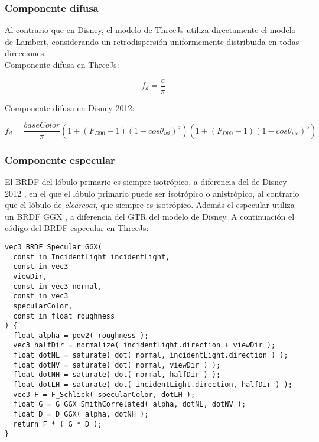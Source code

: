   \subsubsection{Componente difusa}
  Al contrario que en Disney, el modelo de ThreeJs utiliza directamente el modelo de Lambert, considerando un retrodispersi\'on
  uniformemente distribuida en todas direcciones.\\

  Componente difusa en ThreeJs:

  \begin{equation}
    f_d = \frac{c}{\pi}
  \end{equation}
  \singlespacing

  Componente difusa en Disney 2012:

  \begin{equation}
    f_d = \frac{baseColor}{\pi}
    \left(  1 + (F_{D90} - 1)(1 - cos\theta_{wi})^5  \right)
    \left(  1 + (F_{D90} - 1)(1 - cos\theta_{wo})^5  \right)
  \end{equation}
  \singlespacing


  \subsubsection{Componente especular}
  El BRDF del l\'obulo primario es siempre isotr\'opico, a diferencia del de Disney 2012 \autocite{disney12}, en el que
  el l\'obulo primario puede ser isotr\'opico o anistr\'opico, al contrario que el l\'obulo de \textit{clearcoat},
  que siempre es isotr\'opico. Adem\'as el especular utiliza un BRDF GGX \autocite{ggx}, a diferencia del GTR \autocite{disney12} del modelo de Disney.
  A continuaci\'on el c\'odigo del BRDF especular en ThreeJs:

  \singlespacing
  \begin{lstlisting}[caption=Clase MeshClothMaterial]
vec3 BRDF_Specular_GGX(
  const in IncidentLight incidentLight,
  const in vec3
  viewDir,
  const in vec3 normal,
  const in vec3
  specularColor,
  const in float roughness
) {
  float alpha = pow2( roughness );
  vec3 halfDir = normalize( incidentLight.direction + viewDir );
  float dotNL = saturate( dot( normal, incidentLight.direction ) );
  float dotNV = saturate( dot( normal, viewDir ) );
  float dotNH = saturate( dot( normal, halfDir ) );
  float dotLH = saturate( dot( incidentLight.direction, halfDir ) );
  vec3 F = F_Schlick( specularColor, dotLH );
  float G = G_GGX_SmithCorrelated( alpha, dotNL, dotNV );
  float D = D_GGX( alpha, dotNH );
  return F * ( G * D );
}
  \end{lstlisting}
  \singlespacing

